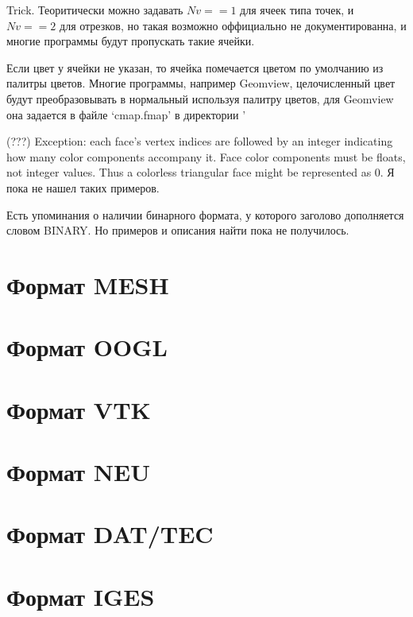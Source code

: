\documentclass[a4paper,12pt]{article}
\begin{document}
Trick. Теоритически можно задавать $Nv==1$ для ячеек типа точек, и $Nv==2$ для отрезков, но такая возможно оффициально не документированна, и многие программы будут пропускать такие ячейки.

Если цвет у ячейки не указан, то ячейка помечается цветом по умолчанию из палитры цветов.
Многие программы, например Geomview, целочисленный цвет будут преобразовывать в нормальный используя палитру цветов, для Geomview она задается в файле `cmap.fmap' в директории '%

(???) Exception: each face's vertex indices are followed by an integer indicating how many color components accompany it. Face color components must be floats, not integer values. Thus a colorless triangular face might be represented as 0. Я пока не нашел таких примеров.

Есть упоминания о наличии бинарного формата, у которого заголово дополняется словом BINARY. Но примеров и описания найти пока не получилось.

\clearpage

\section{Формат MESH}
\section{Формат OOGL}
\section{Формат VTK}
\section{Формат NEU}
\section{Формат DAT/TEC}
\section{Формат IGES}
\end{document}
